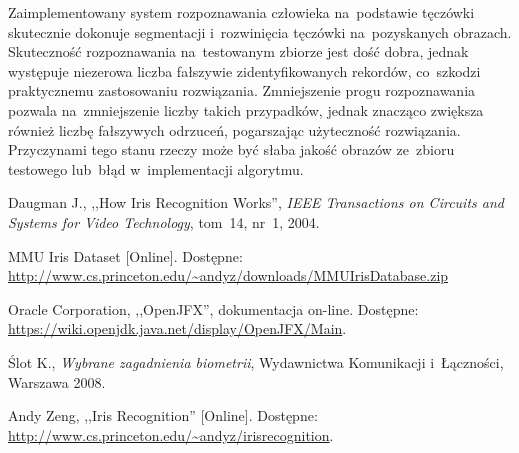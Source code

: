 \documentclass[11pt,a4paper]{article}
\begin{document}
Zaimplementowany system rozpoznawania człowieka na~podstawie tęczówki skutecznie dokonuje segmentacji i~rozwinięcia tęczówki na~pozyskanych obrazach.
Skuteczność rozpoznawania na~testowanym zbiorze jest dość dobra, jednak występuje niezerowa liczba fałszywie zidentyfikowanych rekordów, co~szkodzi praktycznemu zastosowaniu rozwiązania.
Zmniejszenie progu rozpoznawania pozwala na~zmniejszenie liczby takich przypadków, jednak znacząco zwiększa również liczbę fałszywych odrzuceń, pogarszając użyteczność rozwiązania.
Przyczynami tego stanu rzeczy może być słaba jakość obrazów ze~zbioru testowego lub~błąd w~implementacji algorytmu.

\begin{thebibliography}{9}

        Daugman J.,
        ,,How Iris Recognition Works'',
        \emph{IEEE Transactions on Circuits and Systems for Video Technology},
        tom~14,
        nr~1,
        2004.
        
        MMU Iris Dataset
        [Online].
        Dostępne: \url{http://www.cs.princeton.edu/~andyz/downloads/MMUIrisDatabase.zip}

        Oracle Corporation,
        ,,OpenJFX'',
        dokumentacja on-line.
        Dostępne: \url{https://wiki.openjdk.java.net/display/OpenJFX/Main}.

        Ślot K.,
        \emph{Wybrane zagadnienia biometrii},
        Wydawnictwa Komunikacji i~Łączności,
        Warszawa 2008.

        Andy Zeng,
        ,,Iris Recognition''
        [Online].
        Dostępne: \url{http://www.cs.princeton.edu/~andyz/irisrecognition}.

\end{thebibliography}
\end{document}
